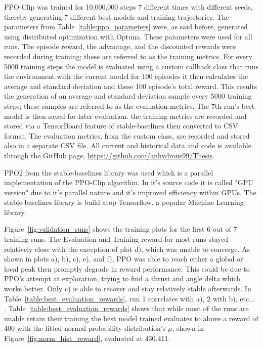 PPO-Clip was trained for 10,000,000 steps 7 different times with different seeds, thereby generating 7 different best models and training trajectories. The parameters from Table~\ref{table:ppo_parameters} were, as said before, generated using distributed optimization with Optuna. These parameters were used for all runs. The episode reward, the advantage, and the discounted rewards were recorded during training; these are referred to as the training metrics. For every 5000 training steps the model is evaluated using a custom callback class that runs the environment with the current model for 100 episodes it then calculates the average and standard deviation and these 100 episode's total reward. This results the generation of an average and standard deviation sample every 5000 training steps; these samples are referred to as the evaluation metrics. The 7th run's best model is then saved for later evaluation. the training metrics are recorded and stored via a TensorBoard feature of stable-baselines then converted to CSV format. The evaluation metrics, from the custom class, are recorded and stored also in a separate CSV file. All current and historical data and code is available through the GitHub page, \href{https://github.com/anhydrous99/Thesis}{https://github.com/anhydrous99/Thesis}.

PPO2 from the stable-baselines library was used which is a parallel implementation of the PPO-Clip algorithm. In it's source code it is called "GPU version" due to it's parallel nature and it's improved efficiency within GPUs. The stable-baselines library is build atop Tensorflow, a popular Machine Learning library.

Figure~\ref{fig:validation_runs} shows the training plots for the first 6 out of 7 training runs. The Evaluation and Training reward for most runs stayed relatively close with the exception of plot d), which was unable to converge. As shown in plots a), b), c), e), and f), PPO was able to reach either a global or local peak then promptly degrade in reward performance. This could be due to PPO's attempt at exploration, trying to find a thrust and angle delta which works better. Only c) is able to recover and stay relatively stable afterwards. In Table~\ref{table:best_evaluation_rewards}, run 1 correlates with a), 2 with b), etc... . Table~\ref{table:best_evaluation_rewards} shows that while most of the runs are unable retain their training the best model trained evaluates to above a reward of 400 with the fitted normal probability distribution's $\mu$, shown in Figure~\ref{fig:norm_hist_reward}, evaluated at 430.411.

